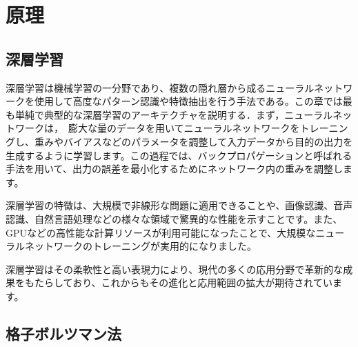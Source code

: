 \chapter{原理 \label{chap-principle}}
\section{深層学習 \label{section:deep-learning}}
深層学習は機械学習の一分野であり、複数の隠れ層から成るニューラルネットワークを使用して高度なパターン認識や特徴抽出を行う手法である。この章では最も単純で典型的な深層学習のアーキテクチャを説明する．まず，ニューラルネットワークは，　膨大な量のデータを用いてニューラルネットワークをトレーニングし、重みやバイアスなどのパラメータを調整して入力データから目的の出力を生成するように学習します。この過程では、バックプロパゲーションと呼ばれる手法を用いて、出力の誤差を最小化するためにネットワーク内の重みを調整します。

深層学習の特徴は、大規模で非線形な問題に適用できることや、画像認識、音声認識、自然言語処理などの様々な領域で驚異的な性能を示すことです。また、GPUなどの高性能な計算リソースが利用可能になったことで、大規模なニューラルネットワークのトレーニングが実用的になりました。

深層学習はその柔軟性と高い表現力により、現代の多くの応用分野で革新的な成果をもたらしており、これからもその進化と応用範囲の拡大が期待されています。

\section{格子ボルツマン法 \label{section:rc-principle}}